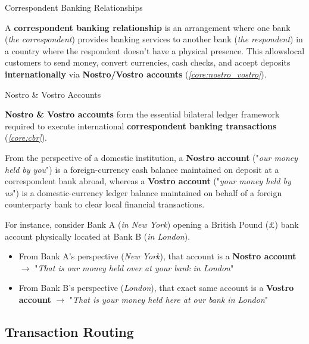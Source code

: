 \documentclass[10pt]{article}
\begin{document}
    \begin{core}[label=core:cbr]{Correspondent Banking Relationships}

      A \textbf{correspondent banking relationship} is an arrangement where one bank (\textit{the correspondent}) provides banking services to another bank (\textit{the respondent}) in a country where the respondent doesn't have a physical presence. This allowslocal customers to send money, convert currencies, cash checks, and accept deposits \textbf{internationally} via \textbf{Nostro/Vostro accounts} (\textit{\autoref{core:nostro_vostro}}).

    \end{core}

    \begin{core}[label=core:nostro_vostro]{Nostro \& Vostro Accounts}

      \textbf{Nostro \& Vostro accounts} form the essential bilateral ledger framework required to execute international \textbf{correspondent banking transactions} (\textit{\autoref{core:cbr}}). 

      From the perspective of a domestic institution, a \textbf{Nostro account} ("\textit{our money held by you}") is a foreign-currency cash balance maintained on deposit at a correspondent bank abroad, whereas a \textbf{Vostro account} ("\textit{your money held by us}") is a domestic-currency ledger balance maintained on behalf of a foreign counterparty bank to clear local financial transactions.

      For instance, consider Bank A (\textit{in New York}) opening a British Pound (£) bank account physically located at Bank B (\textit{in London}).

      \begin{itemize}

        \item From Bank A’s perspective (\textit{New York}), that account is a \textbf{Nostro account} $\rightarrow$ "\textit{That is our money held over at your bank in London}"

        \item From Bank B’s perspective (\textit{London}), that exact same account is a \textbf{Vostro account} $\rightarrow$ "\textit{That is your money held here at our bank in London}"

      \end{itemize}

    \end{core}

  \subsection{Transaction Routing}
\end{document}
